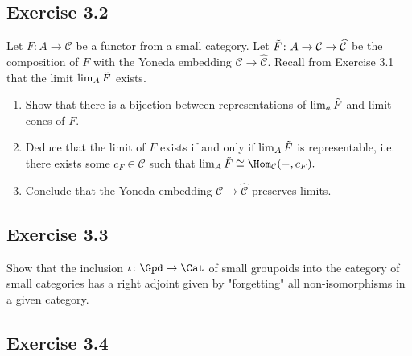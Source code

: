 \subsection{ Exercise 3.2 }

Let $ F \colon A \to \mathcal{ C } $ be a functor from a small category. Let $ \Tilde{ F } \colon A \to  \mathcal{ C } \to \widehat{ \mathcal{ C } } $ be the composition of $ F $ with the Yoneda embedding $ \mathcal{ C } \to \widehat{ \mathcal{ C } } $. Recall from Exercise 3.1 that the limit $ \lim_A \Tilde{ F } $ exists.

\begin{enumerate}[label=(\alph*)]
    \item 
    Show that there is a bijection between representations of $\lim_a \Tilde{ F } $ and limit cones of $ F $.

    \item 
    Deduce that the limit of $ F $ exists if and only if $ \lim_A \Tilde{ F } $ is representable, i.e. there exists some $ c_F \in \mathcal{ C } $ such that $ \lim_A  \Tilde{ F } \cong \Hom_{ \mathcal{ C } } ( - , c_F ) . $ 

    \item 
    Conclude that the Yoneda embedding $ \mathcal{ C } \to \widehat{ \mathcal{ C } } $ preserves limits.
\end{enumerate}

\subsection{Exercise 3.3}

Show that the inclusion $ \iota \colon \Gpd \to \Cat $ of small groupoids into the category of small categories has a right adjoint given by "forgetting" all non-isomorphisms in a given category.

\subsection{Exercise 3.4}

